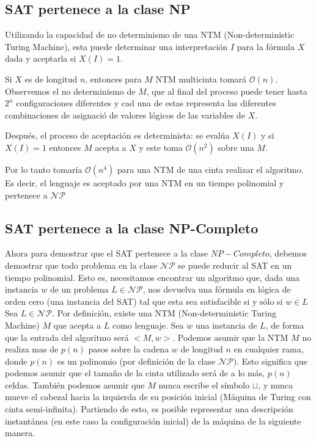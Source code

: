 \documentclass[a4paper]{article}
\begin{document}
\subsection{SAT pertenece a la clase NP}


Utilizando la capacidad de no determinismo de una NTM (Non-deterministic Turing Machine), esta puede determinar una interpretación $I$ para la fórmula $X$ dada y aceptarla si $X(I)=1$. 


Si $X$ es de longitud $n$, entonces para $M$ NTM multicinta tomará $\mathcal{O}(n)$. Observemos el no determinismo de $M$, que al final del proceso puede tener hasta $2^{n}$ configuraciones diferentes y cad una de estas representa las diferentes combinaciones de asignació de valores lógicos de las variables de $X$.


Después, el proceso de aceptación es determinista: se evalúa $X(I)$ y si $X(I)=1$ entonces $M$ acepta a $X$ y este toma  $\mathcal{O}(n^{2})$ sobre una $M$.


Por lo tanto tomaría $\mathcal{O}(n^{4})$ para una NTM de una cinta realizar el algoritmo. Es decir, el lenguaje es aceptado por una NTM en un tiempo polinomial y pertenece a $\mathcal{NP}$


\subsection{SAT pertenece a la clase NP-Completo}
Ahora para demostrar que el SAT pertenece a la clase $NP-Completo$, debemos demostrar que todo problema en la clase $\mathcal{NP}$ se puede reducir al SAT en un tiempo polinomial. Esto es, necesitamos encontrar un algoritmo que, dada una instancia $w$ de un problema $L \in \mathcal{NP}$, nos devuelva una fórmula en lógica de orden cero (una instancia del SAT) tal que esta sea satisfacible si y sólo si $w\in L$\\


Sea $L \in \mathcal{NP}$. Por definición, existe una NTM (Non-deterministic Turing Machine) $M$ que acepta a $L$ como lenguaje. Sea $w$ una instancia de $L$, de forma que la entrada del algoritmo será $<M,w>$. Podemos asumir que la NTM $M$ no realiza mas de $p(n)$ pasos sobre la cadena $w$ de longitud $n$ en cualquier rama, donde $p(n)$ es un polinomio (por definición de la clase $\mathcal{NP}$). Esto significa que podemos asumir que el tamaño de la cinta utilizado será de a lo más, $p(n)$ celdas. También podemos asumir que $M$ nunca escribe el símbolo $\sqcup$, y nunca mueve el cabezal hacia la izquierda de su posición inicial (Máquina de Turing con cinta semi-infinita).
Partiendo de esto, es posible representar una descripción instantánea (en este caso la configuración inicial) de la máquina de la siguiente manera.
\end{document}
